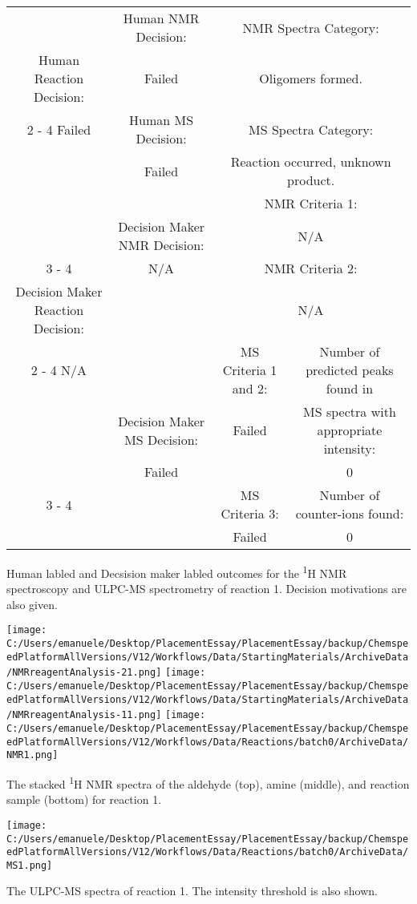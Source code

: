 \documentclass{article}%
\begin{document}
\begin{Decision Table}[H]%
\begin{tabular}{|c|c|c|c|}%
\hline%
&Human NMR Decision:&\multicolumn{2}{|c|}{NMR Spectra Category:}\\%
Human Reaction Decision:&Failed&\multicolumn{2}{|c|}{Oligomers formed.}\\%
\cline{2%
-%
4}%
Failed&Human MS Decision:&\multicolumn{2}{|c|}{MS Spectra Category:}\\%
&Failed&\multicolumn{2}{|c|}{Reaction occurred, unknown product.}\\%
\hline%
&&\multicolumn{2}{|c|}{NMR Criteria 1:}\\%
&Decision Maker NMR Decision:&\multicolumn{2}{|c|}{N/A}\\%
\cline{3%
-%
4}%
&N/A&\multicolumn{2}{|c|}{NMR Criteria 2:}\\%
Decision Maker Reaction Decision:&&\multicolumn{2}{|c|}{N/A}\\%
\cline{2%
-%
4}%
N/A&&MS Criteria 1 and 2:&Number of predicted peaks found in\\%
&Decision Maker MS Decision:&Failed&MS spectra with appropriate intensity:\\%
&Failed&&0\\%
\cline{3%
-%
4}%
&&MS Criteria 3:&Number of counter{-}ions found:\\%
&&Failed&0\\%
\hline%
\end{tabular}%
\caption{Human labled and Decsision maker labled outcomes for the \textsuperscript{1}H NMR spectroscopy and ULPC-MS spectrometry of reaction 1. Decision motivations are also given.}%
\end{Decision Table}%
\begin{NMR Spectra}[H]%
\begin{center}%
\texttt{[image: C:/Users/emanuele/Desktop/PlacementEssay/PlacementEssay/backup/ChemspeedPlatformAllVersions/V12/Workflows/Data/StartingMaterials/ArchiveData/NMRreagentAnalysis-21.png]}\hfill%
\texttt{[image: C:/Users/emanuele/Desktop/PlacementEssay/PlacementEssay/backup/ChemspeedPlatformAllVersions/V12/Workflows/Data/StartingMaterials/ArchiveData/NMRreagentAnalysis-11.png]}\hfill%
\texttt{[image: C:/Users/emanuele/Desktop/PlacementEssay/PlacementEssay/backup/ChemspeedPlatformAllVersions/V12/Workflows/Data/Reactions/batch0/ArchiveData/NMR1.png]}\hfill%
\end{center}%
\caption{The stacked \textsuperscript{1}H NMR spectra of the aldehyde (top), amine (middle), and reaction sample (bottom) for reaction 1.}%
\end{NMR Spectra}%
\begin{MS Spectra}[H]%
\begin{center}%
\texttt{[image: C:/Users/emanuele/Desktop/PlacementEssay/PlacementEssay/backup/ChemspeedPlatformAllVersions/V12/Workflows/Data/Reactions/batch0/ArchiveData/MS1.png]}\hfill%
\end{center}%
\caption{The ULPC-MS spectra of reaction 1. The intensity threshold is also shown.}%
\end{MS Spectra}%
\end{document}
